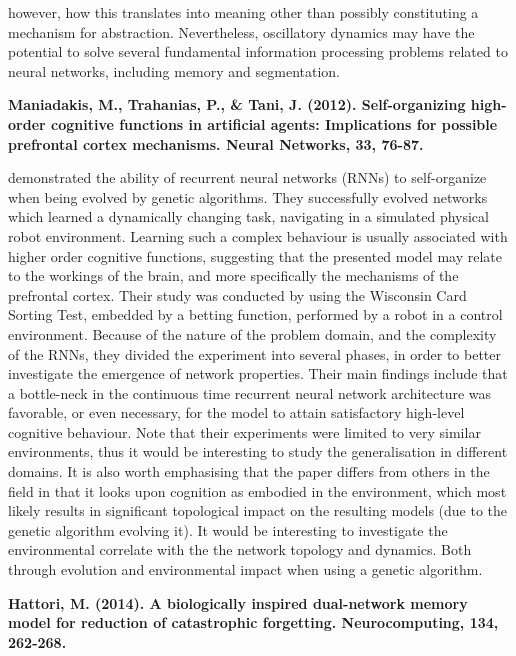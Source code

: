 however, how this translates into meaning other than possibly constituting a mechanism for abstraction. Nevertheless, oscillatory dynamics may have the potential to solve several fundamental information processing problems related to neural networks, including memory and segmentation.


\textbf{Maniadakis, M., Trahanias, P., \& Tani, J. (2012). Self-organizing high-order cognitive functions in artificial agents: Implications for possible prefrontal cortex mechanisms. Neural Networks, 33, 76-87.}

\cite{Maniadakis2012} demonstrated the ability of recurrent neural networks (RNNs) to self-organize when being evolved by genetic algorithms. They successfully evolved networks which learned a dynamically changing task, navigating in a simulated physical robot environment. Learning such a complex behaviour is usually associated with higher order cognitive functions, suggesting that the presented model may relate to the workings of the brain, and more specifically the mechanisms of the prefrontal cortex.
Their study was conducted by using the Wisconsin Card Sorting Test, embedded by a betting function, performed by a robot in a control environment. Because of the nature of the problem domain, and the complexity of the RNNs, they divided the experiment into several phases, in order to better investigate the emergence of network properties. Their main findings include that a bottle-neck in the continuous time recurrent neural network architecture was favorable, or even necessary, for the model to attain satisfactory high-level cognitive behaviour. Note that their experiments were limited to very similar environments, thus it would be interesting to study the generalisation in different domains. It is also worth emphasising that the paper differs from others in the field in that it looks upon cognition as embodied in the environment, which most likely results in significant topological impact on the resulting models (due to the genetic algorithm evolving it). It would be interesting to investigate the environmental correlate with the the network topology and dynamics. Both through evolution and environmental impact when using a genetic algorithm.


\textbf{Hattori, M. (2014). A biologically inspired dual-network memory model for reduction of catastrophic forgetting. Neurocomputing, 134, 262-268.}

